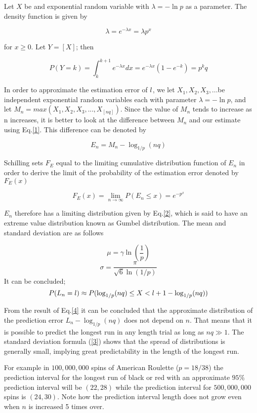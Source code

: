 \documentclass{article}
\begin{document}
Let $X$ be and exponential random variable with $\lambda = -\ln p$ as a parameter. The density function is given by

   \[ \lambda=e^{-\lambda x}=\lambda p^x\]

for $x \geq 0$. Let $Y = [X]$; then

\[P(Y=k) = \int_{k}^{k+1} e^{-\lambda x} dx = e^{-\lambda x}(1-e^{-k})=p^kq\]

In order to approximate the estimation error of $\mathnormal{l}$, we let $X_1,X_2,X_3,$...be independent exponential random variables each with parameter $\lambda=-\ln p$, and let $M_n=max(X_1,X_2,X_3,...,X_{[nq]})$. Since the value of $M_n$ tends to increase as n increases, it is better to look at the difference between $M_n$ and our estimate using Eq.\ref{1}. This difference can be denoted by

\[ E_n=M_n-\log_{1/p}(nq) \]

Schilling sets $F_E$ equal to the limiting cumulative distribution function of $E_n$ in order to derive the limit of the probability of the estimation error denoted by $F_E(x)$

\begin{equation}\label{2}
     F_E(x) = \lim_{n \to \infty } P(E_n \leq x) = e^{-p^x} 
\end{equation}

$E_n$ therefore has a limiting distribution given by Eq.\ref{2}, which is said to have an extreme value distribution known as Gumbel distribution. The mean and  standard deviation are as follows

\[ \mu = \gamma \ln\left(\frac{1}{p}\right) \]
\begin{equation}\label{3}
   \sigma = \frac{\pi}{\sqrt{6}\ln\left(1/p\right)}
\end{equation}
It can be concluded;
\begin{equation}\label{4}
    P(L_n= \mathnormal{l}) \approx P(\log_{1/p}(nq) \leq X < \mathnormal{l} + 1 - \log_{1/p}(nq))
\end{equation}

From the result of Eq.\ref{4} it can be concluded that the approximate distribution of the prediction error $L_n-\log_{1/p}(nq)$ does not depend on $n$. That means that it is possible to predict the longest run in any length trial as long as $nq \gg 1$. The standard deviation formula (\ref{3}) shows that the spread of distributions is generally small, implying great predictability in the length of the longest run.

For example in $100,000,000$ spins of American Roulette ($p=18/38$) the prediction interval for the longest run of black or red with an approximate $95\%$ prediction interval will be $(22,28)$ while the prediction interval for $500,000,000$ spins is $(24,30)$. Note how the prediction interval length does not grow even when $n$ is increased 5 times over.
\end{document}
